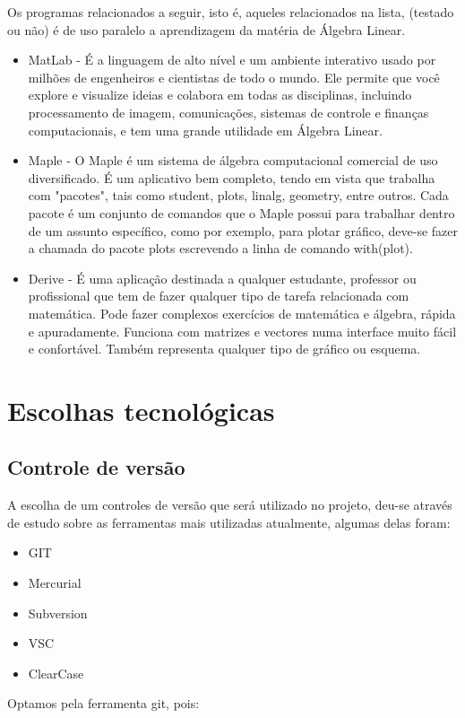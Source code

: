 \documentclass[12pt,a4paper]{article}
\begin{document}
\begin{itemize}
Os programas relacionados a seguir, isto é, aqueles relacionados na lista, (testado ou não) é de uso paralelo a aprendizagem da matéria de Álgebra Linear.

\begin{itemize}
\item MatLab - É a linguagem de alto nível e um ambiente interativo usado por milhões de engenheiros e cientistas de todo o mundo. Ele permite que você explore e visualize ideias e colabora em todas as disciplinas, incluindo processamento de imagem, comunicações, sistemas de controle e finanças computacionais, e tem uma grande utilidade em Álgebra Linear.

\item Maple - O Maple é um sistema de álgebra computacional comercial de uso diversificado. É um aplicativo bem completo, tendo em vista que trabalha com "pacotes", tais como student, plots, linalg, geometry, entre outros. Cada pacote é um conjunto de comandos que o Maple possui para trabalhar dentro de um assunto específico, como por exemplo, para plotar gráfico, deve-se fazer a chamada do pacote plots escrevendo a linha de comando with(plot).

\item Derive -  É uma aplicação destinada a qualquer estudante, professor ou profissional que tem de fazer qualquer tipo de tarefa relacionada com matemática. Pode fazer complexos exercícios de matemática e álgebra, rápida e apuradamente. Funciona com matrizes e vectores numa interface muito fácil e confortável. Também representa qualquer tipo de gráfico ou esquema.

\end{itemize}
\end{itemize}

\section{Escolhas tecnológicas}

\subsection {Controle de versão}
A escolha de um controles de versão que será utilizado no projeto, deu-se através de estudo sobre as ferramentas mais utilizadas atualmente, algumas delas foram:
\begin{itemize}
\item GIT
\item Mercurial
\item Subversion
\item VSC
\item ClearCase
\end{itemize}
Optamos pela ferramenta git, pois:
\end{document}
